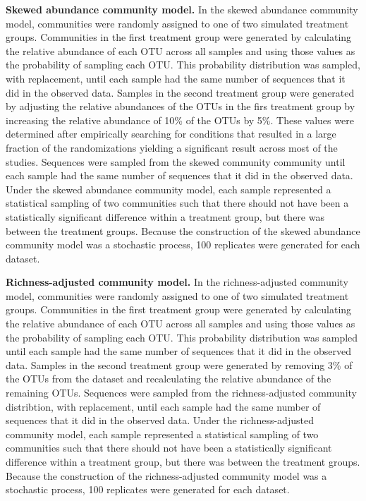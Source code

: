 \documentclass[
]{article}
\begin{document}
\textbf{Skewed abundance community model.} In the skewed abundance
community model, communities were randomly assigned to one of two
simulated treatment groups. Communities in the first treatment group
were generated by calculating the relative abundance of each OTU across
all samples and using those values as the probability of sampling each
OTU. This probability distribution was sampled, with replacement, until
each sample had the same number of sequences that it did in the observed
data. Samples in the second treatment group were generated by adjusting
the relative abundances of the OTUs in the firs treatment group by
increasing the relative abundance of 10\% of the OTUs by 5\%. These
values were determined after empirically searching for conditions that
resulted in a large fraction of the randomizations yielding a
significant result across most of the studies. Sequences were sampled
from the skewed community community until each sample had the same
number of sequences that it did in the observed data. Under the skewed
abundance community model, each sample represented a statistical
sampling of two communities such that there should not have been a
statistically significant difference within a treatment group, but there
was between the treatment groups. Because the construction of the skewed
abundance community model was a stochastic process, 100 replicates were
generated for each dataset.

\textbf{Richness-adjusted community model.} In the richness-adjusted
community model, communities were randomly assigned to one of two
simulated treatment groups. Communities in the first treatment group
were generated by calculating the relative abundance of each OTU across
all samples and using those values as the probability of sampling each
OTU. This probability distribution was sampled until each sample had the
same number of sequences that it did in the observed data. Samples in
the second treatment group were generated by removing 3\% of the OTUs
from the dataset and recalculating the relative abundance of the
remaining OTUs. Sequences were sampled from the richness-adjusted
community distribtion, with replacement, until each sample had the same
number of sequences that it did in the observed data. Under the
richness-adjusted community model, each sample represented a statistical
sampling of two communities such that there should not have been a
statistically significant difference within a treatment group, but there
was between the treatment groups. Because the construction of the
richness-adjusted community model was a stochastic process, 100
replicates were generated for each dataset.
\end{document}
